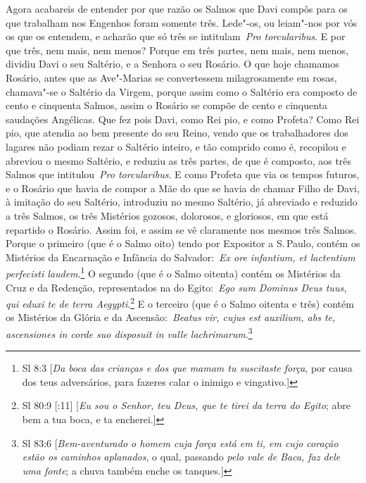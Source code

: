 Agora acabareis de entender por que razão os Salmos que
Davi compôs para os que trabalham nos Engenhos foram somente três.
Lede"-os, ou leiam"-nos por vós os que os entendem, e acharão que só três
se intitulam~\emph{Pro torcularibus}. E por que três, nem mais, nem
menos? Porque em três partes, nem mais, nem menos, dividiu Davi o seu
Saltério, e a Senhora o seu Rosário. O que hoje chamamos Rosário, antes
que as Ave"-Marias se convertessem milagrosamente em rosas, chamava"-se o
Saltério da Virgem, porque assim como o Saltério era composto de cento e
cinquenta Salmos, assim o Rosário se compõe de cento e cinquenta
saudações Angélicas. Que fez pois Davi, como Rei pio, e como Profeta?
Como Rei pio, que atendia ao bem presente do seu Reino, vendo que os
trabalhadores dos lagares não podiam rezar o Saltério inteiro, e tão
comprido como é, recopilou e abreviou o mesmo Saltério, e reduziu as
três partes, de que é composto, aos três Salmos que intitulou~\emph{Pro
torcularibus}. E como Profeta que via os tempos futuros, e o Rosário que
havia de compor a Mãe do que se havia de chamar Filho de Davi, à
imitação do seu Saltério, introduziu no mesmo Saltério, já abreviado e
reduzido a três Salmos, os três Mistérios gozosos, dolorosos, e
gloriosos, em que está repartido o Rosário. Assim foi, e assim se vê
claramente nos mesmos três Salmos. Porque o primeiro (que é o Salmo
oito) tendo por Expositor a S.\,Paulo, contém os Mistérios da Encarnação
e Infância do Salvador:~\emph{Ex ore infantium, et lactentium perfecisti
laudem}.\footnote{Sl 8:3 [\textit{Da boca das crianças e dos que mamam tu suscitaste força}, por causa dos teus adversários, para fazeres calar o inimigo e vingativo.]} O segundo (que é o Salmo oitenta) contém os
Mistérios da Cruz e da Redenção, representados na do Egito:~\emph{Ego
sum Dominus Deus tuus, qui eduxi te de terra Aegypti}.\footnote{Sl 80:9 [:11] [\textit{Eu sou o Senhor, teu Deus, que te tirei da terra do Egito}; abre bem a tua boca, e ta
encherei.]}
E o terceiro (que é o Salmo oitenta e três) contém os Mistérios da
Glória e da Ascensão:~\emph{Beatus vir, cujus est auxilium, abs te,
ascensiones in corde suo disposuit in valle
lachrimarum}.\footnote{Sl 83:6 [\textit{Bem-aventurado o homem cuja força está em ti, em cujo coração estão os caminhos aplanados}, o qual, passando \textit{pelo vale de Baca, faz dele uma fonte}; a chuva também enche os tanques.]}



